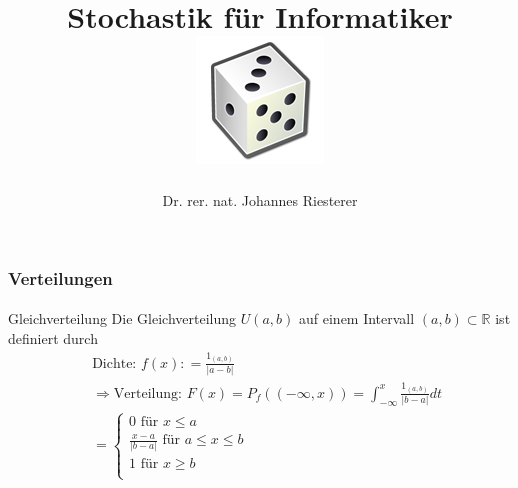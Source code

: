 \documentclass{beamer}
\begin{document}
\title[Stochastik] %
{Stochastik für Informatiker
\\
\includegraphics[scale=0.5]{img/craps}
}
\subtitle{}
\author[Dr. Johannes Riesterer] %
{Dr.  rer. nat. Johannes Riesterer}

\date[KPT 2004] %
{}

\subject{Stochastik}

\frame{\titlepage}




\begin{frame}
    \frametitle{Verteilungen}
\framesubtitle{}

\begin{block}{Gleichverteilung}
Die Gleichverteilung $U{(a,b)}$ auf einem Intervall $(a,b) \subset \mathbb{R}$ ist definiert durch
\begin{align*}
& \text{Dichte: } f (x) : = \frac{1_{(a,b)}}{|a-b| } \\
& \Rightarrow \text{Verteilung: } F (x) =  P_f( (-\infty, x))  =  \int_{-\infty}^{x} \frac{1_{(a,b)}}{|b-a|} dt\\\
& = \begin {cases} 0 \text{ für } x \leq a \\   \frac{x-a}{|b-a|} \text{ für } a \leq x \leq b \\ 1 \text{ für }  x \geq b \\  \end{cases}
\end{align*}
\end{block}

 \end{frame}
\end{document}
